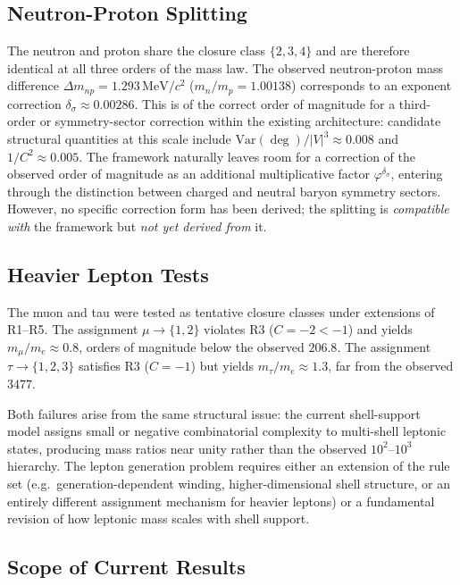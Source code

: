 \documentclass[12pt]{article}
\newcommand{\phig}{\varphi}
\begin{document}
\subsection{Neutron-Proton Splitting}

The neutron and proton share the closure class $\{2,3,4\}$ and are therefore identical at all three orders of the mass law. The observed neutron-proton mass difference $\Delta m_{np} = 1.293\,\mathrm{MeV}/c^2$ ($m_n/m_p = 1.00138$) corresponds to an exponent correction $\delta_\sigma \approx 0.00286$. This is of the correct order of magnitude for a third-order or symmetry-sector correction within the existing architecture: candidate structural quantities at this scale include $\mathrm{Var}(\deg)/|V|^3 \approx 0.008$ and $1/C^2 \approx 0.005$. The framework naturally leaves room for a correction of the observed order of magnitude as an additional multiplicative factor $\phig^{\delta_\sigma}$, entering through the distinction between charged and neutral baryon symmetry sectors. However, no specific correction form has been derived; the splitting is \textit{compatible with} the framework but \textit{not yet derived from} it.

\subsection{Heavier Lepton Tests}

The muon and tau were tested as tentative closure classes under extensions of R1--R5. The assignment $\mu \to \{1,2\}$ violates R3 ($C = -2 < -1$) and yields $m_\mu/m_e \approx 0.8$, orders of magnitude below the observed $206.8$. The assignment $\tau \to \{1,2,3\}$ satisfies R3 ($C = -1$) but yields $m_\tau/m_e \approx 1.3$, far from the observed $3477$.

Both failures arise from the same structural issue: the current shell-support model assigns small or negative combinatorial complexity to multi-shell leptonic states, producing mass ratios near unity rather than the observed $10^2$--$10^3$ hierarchy. The lepton generation problem requires either an extension of the rule set (e.g.\ generation-dependent winding, higher-dimensional shell structure, or an entirely different assignment mechanism for heavier leptons) or a fundamental revision of how leptonic mass scales with shell support.

\subsection{Scope of Current Results}
\end{document}
